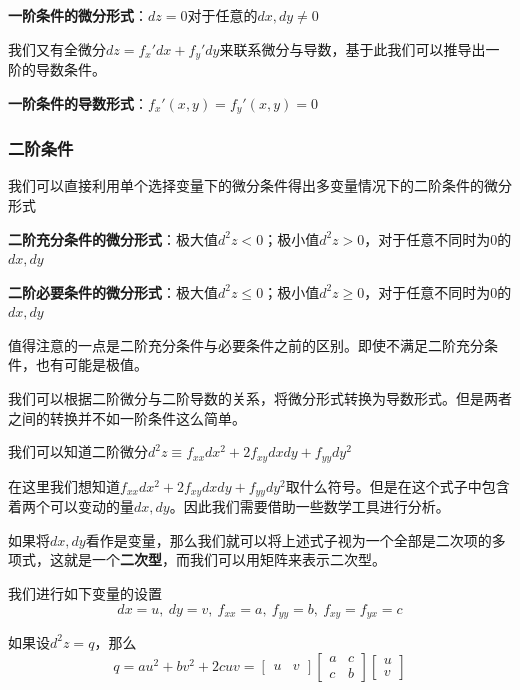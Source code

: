\documentclass[UTF8,12pt]{ctexart}
\numberwithin{equation}{section} %
\numberwithin{figure}{section}
\numberwithin{table}{section}
\begin{document}
	\textbf{一阶条件的微分形式}：$dz = 0$对于任意的$dx,dy \neq 0$
	
	我们又有全微分$dz = f_x'dx + f_y'dy$来联系微分与导数，基于此我们可以推导出一阶的导数条件。
	
	\textbf{一阶条件的导数形式}：$f_x'(x,y) = f_y'(x,y) = 0$
	
	\subsubsection{二阶条件}
	
	我们可以直接利用单个选择变量下的微分条件得出多变量情况下的二阶条件的微分形式
	
	\textbf{二阶充分条件的微分形式}：极大值$d^2z < 0$；极小值$d^2z > 0$，对于任意不同时为0的$dx,dy$
	
	\textbf{二阶必要条件的微分形式}：极大值$d^2z \leqslant 0$；极小值$d^2z \geqslant 0$，对于任意不同时为0的$dx,dy$
	
	值得注意的一点是二阶充分条件与必要条件之前的区别。即使不满足二阶充分条件，也有可能是极值。
	
	我们可以根据二阶微分与二阶导数的关系，将微分形式转换为导数形式。但是两者之间的转换并不如一阶条件这么简单。
	
	我们可以知道二阶微分$d^2z \equiv f_{xx}dx^2 + 2f_{xy}dxdy + f_{yy}dy^2$
	
	在这里我们想知道$f_{xx}dx^2 + 2f_{xy}dxdy + f_{yy}dy^2$取什么符号。但是在这个式子中包含着两个可以变动的量$dx,dy$。因此我们需要借助一些数学工具进行分析。
	
	如果将$dx,dy$看作是变量，那么我们就可以将上述式子视为一个全部是二次项的多项式，这就是一个\textbf{二次型}，而我们可以用矩阵来表示二次型。
	
	我们进行如下变量的设置
	\begin{equation}
		dx = u, \ dy = v, \ f_{xx} = a, \ f_{yy} = b, \ f_{xy} = f_{yx} = c
	\end{equation}
	
	如果设$d^2z = q$，那么
	\begin{equation}
		q = au^2 + bv^2 + 2cuv 
		=
		\begin{bmatrix}
			u & v
		\end{bmatrix}
		\begin{bmatrix}
			a & c \\
			c & b
		\end{bmatrix}
		\begin{bmatrix}
			u \\
			v
		\end{bmatrix} 
	\end{equation}
	
\end{document}
